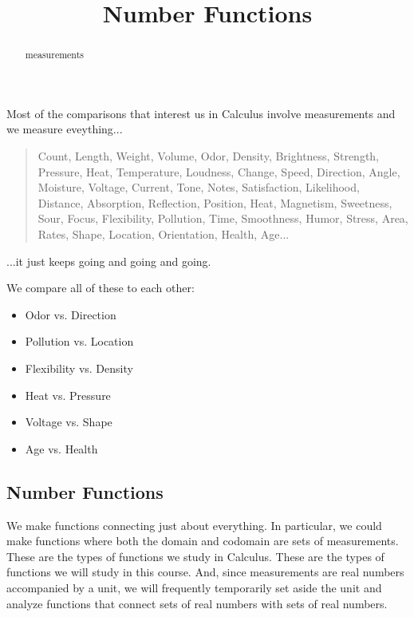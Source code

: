 \documentclass{ximera}
\title{Number Functions}
\begin{document}
\begin{abstract}
measurements
\end{abstract}
\maketitle





Most of the comparisons that interest us in Calculus involve measurements and we measure eveything...

\begin{quote}
Count, Length, Weight, Volume, Odor, Density, Brightness, Strength, Pressure, Heat, Temperature, Loudness, Change, Speed, Direction, Angle, Moisture, Voltage, Current, Tone, Notes, Satisfaction, Likelihood, Distance, Absorption, Reflection, Position, Heat, Magnetism, Sweetness, Sour, Focus, Flexibility, Pollution, Time, Smoothness, Humor, Stress, Area, Rates, Shape, Location, Orientation, Health, Age... 
\end{quote}


...it just keeps going and going and going. 


We compare all of these to each other:



\begin{itemize}
\item Odor vs. Direction
\item Pollution vs. Location
\item Flexibility vs. Density
\item Heat vs. Pressure
\item Voltage vs. Shape 
\item Age vs. Health
\end{itemize}







\subsection*{Number Functions}

We make functions connecting just about everything.  In particular, we could make functions where both the domain and codomain are sets of measurements. These are the types of functions we study in Calculus.  These are the types of functions we will study in this course.  And, since measurements are real numbers accompanied by a unit, we will frequently temporarily set aside the unit and analyze functions that connect sets of real numbers with sets of real numbers. 
\end{document}
